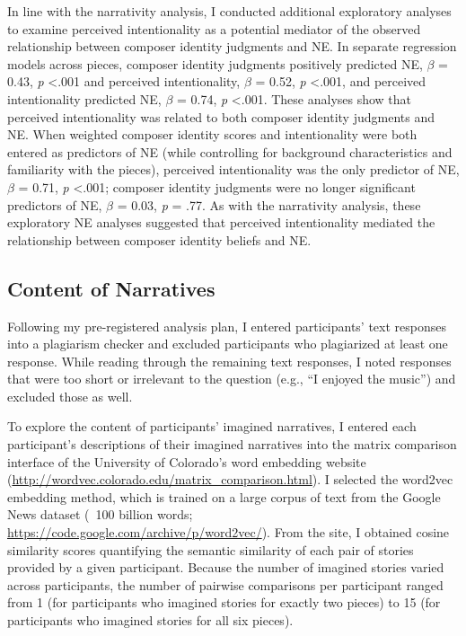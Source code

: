 \documentclass[12pt,twoside]{reedthesis}
\begin{document}
In line with the narrativity analysis, I conducted additional exploratory analyses to examine perceived intentionality as a potential mediator of the observed relationship between composer identity judgments and NE. In separate regression models across pieces, composer identity judgments positively predicted NE, $\beta$ = 0.43, \emph{p} \textless .001 and perceived intentionality, $\beta$ = 0.52, \emph{p} \textless .001, and perceived intentionality predicted NE, $\beta$ = 0.74, \emph{p} \textless .001. These analyses show that perceived intentionality was related to both composer identity judgments and NE. When weighted composer identity scores and intentionality were both entered as predictors of NE (while controlling for background characteristics and familiarity with the pieces), perceived intentionality was the only predictor of NE, $\beta$ = 0.71, \emph{p} \textless .001; composer identity judgments were no longer significant predictors of NE, $\beta$ = 0.03, \emph{p} = .77. As with the narrativity analysis, these exploratory NE analyses suggested that perceived intentionality mediated the relationship between composer identity beliefs and NE.


\subsection*{Content of Narratives}

Following my pre-registered analysis plan, I entered participants’ text responses into a plagiarism checker and excluded participants who plagiarized at least one response. While reading through the remaining text responses, I noted responses that were too short or irrelevant to the question (e.g., “I enjoyed the music”) and excluded those as well.

To explore the content of participants’ imagined narratives, I entered each participant’s descriptions of their imagined narratives into the matrix comparison interface of the University of Colorado’s word embedding website (\url{http://wordvec.colorado.edu/matrix_comparison.html}). I selected the word2vec embedding method, which is trained on a large corpus of text from the Google News dataset (~100 billion words; \url{https://code.google.com/archive/p/word2vec/}). From the site, I obtained cosine similarity scores quantifying the semantic similarity of each pair of stories provided by a given participant. Because the number of imagined stories varied across participants, the number of pairwise comparisons per participant ranged from 1 (for participants who imagined stories for exactly two pieces) to 15 (for participants who imagined stories for all six pieces).
\end{document}
